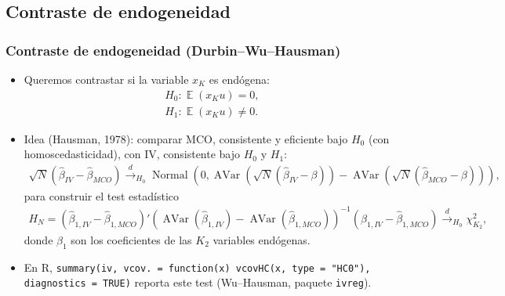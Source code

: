 \documentclass[t, compress, spanish, aspectratio=169]{beamer}
\DeclareMathOperator{\Avar}{AVar}
\DeclareMathOperator{\N}{Normal}
\DeclareMathOperator{\E}{\mathbb{E}}
\newcommand{\dto}{\stackrel{d}{\longrightarrow}}
\begin{document}
\subsection{Contraste de endogeneidad}
\begin{frame}
    \frametitle{Contraste de endogeneidad (Durbin--Wu--Hausman)}
    \vspace*{-0.6em}
    \small
    \begin{itemize}
        \item <1->Queremos contrastar si la variable $x_K$ es end\'ogena:
        \begin{align*}
            H_0: \E(x_K u)=0,\\
            H_1: \E(x_K u)\neq 0.
        \end{align*}
        \item <2-> Idea (Hausman, 1978): comparar MCO, consistente y eficiente bajo $H_0$ (con homoscedasticidad), con IV, consistente bajo $H_0$ y $H_1$:
        \scriptsize{
        \begin{align*}
             \sqrt{N}(\hat \beta_{IV}-\hat \beta_{MCO}) \dto_{H_0} \N(0,\Avar(\sqrt{N}(\hat \beta_{IV}-\beta))-\Avar(\sqrt{N}(\hat \beta_{MCO}-\beta))),
        \end{align*}
        para construir el test estad\'istico
        \begin{align*}
            H_N= (\hat \beta_{1,IV}-\hat \beta_{1,MCO})'(\Avar(\hat \beta_{1,IV})-\Avar(\hat \beta_{1,MCO}))^{-1} (\hat \beta_{1,IV}-\hat \beta_{1,MCO})\dto_{H_0} \chi^2_{K_2},
        \end{align*}
        donde $\hat \beta_{1}$ son los coeficientes de las $K_2$ variables end\'ogenas.
        }
        \item <3-> En R, \texttt{summary(iv, vcov. = function(x) vcovHC(x, type = "HC0"), diagnostics = TRUE)} reporta este test (Wu--Hausman, paquete \texttt{ivreg}).
    \end{itemize}
\end{frame}
\end{document}
